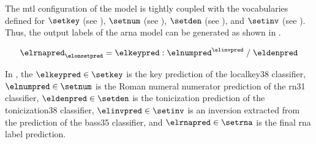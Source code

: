 
The \gls{mtl} configuration of the model is tightly coupled
with the vocabularies defined for $\setkey$ (see
), $\setnum$ (see
), $\setden$
(see ), and
$\setinv$ (see
). Thus, the
output labels of the \gls{arna} model can be generated as
shown in . 

\begin{equation}
    \label{eq:rna_pred}
    \elrnapred_{\elonsetpred} = \elkeypred : \elnumpred^{\elinvpred} \; / \; \eldenpred
\end{equation}

In , the $\elkeypred \in \setkey$ is the key
prediction of the \gls{localkey38} classifier, $\elnumpred
\in \setnum$ is the Roman numeral numerator prediction of
the \gls{rn31} classifier, $\eldenpred \in \setden$ is the
tonicization prediction of the \gls{tonicization38}
classifier, $\elinvpred \in \setinv$ is an inversion
extracted from the prediction of the \gls{bass35}
classifier, and $\elrnapred \in \setrna$ is the final
\gls{rna} label prediction.
